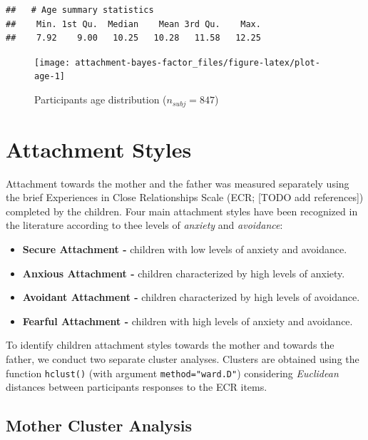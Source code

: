 \documentclass[
]{book}
\providecommand{\tightlist}{%
  \setlength{\itemsep}{0pt}\setlength{\parskip}{0pt}}
\begin{document}
\begin{verbatim}
##   # Age summary statistics
##    Min. 1st Qu.  Median    Mean 3rd Qu.    Max. 
##    7.92    9.00   10.25   10.28   11.58   12.25
\end{verbatim}

\begin{figure}

{\centering \texttt{[image: attachment-bayes-factor\_files/figure-latex/plot-age-1]} 

}

\caption{Participants age distribution ($n_{subj} = 847$)}\label{fig:plot-age}
\end{figure}

\hypertarget{attachment-styles}{%
\section{Attachment Styles}\label{attachment-styles}}

Attachment towards the mother and the father was measured separately using the brief Experiences in Close Relationships Scale (ECR; {[}TODO add references{]}) completed by the children. Four main attachment styles have been recognized in the literature according to thee levels of \emph{anxiety} and \emph{avoidance}:

\begin{itemize}
\tightlist
\item
  \textbf{Secure Attachment -} children with low levels of anxiety and avoidance.
\item
  \textbf{Anxious Attachment -} children characterized by high levels of anxiety.
\item
  \textbf{Avoidant Attachment -} children characterized by high levels of avoidance.
\item
  \textbf{Fearful Attachment -} children with high levels of anxiety and avoidance.
\end{itemize}

To identify children attachment styles towards the mother and towards the father, we conduct two separate cluster analyses. Clusters are obtained using the function \texttt{hclust()} (with argument \texttt{method="ward.D"}) considering \emph{Euclidean} distances between participants responses to the ECR items.

\hypertarget{mother-cluster-analysis}{%
\subsection{Mother Cluster Analysis}\label{mother-cluster-analysis}}
\end{document}
